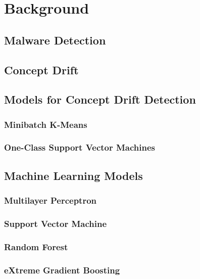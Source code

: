 \chapter{Background\label{chap:background}}

\section{Malware Detection}
\section{Concept Drift}
\section{Models for Concept Drift Detection}
\subsection{Minibatch K-Means}
\subsection{One-Class Support Vector Machines}
\section{Machine Learning Models}
\subsection{Multilayer Perceptron}
\subsection{Support Vector Machine}
\subsection{Random Forest}
\subsection{eXtreme Gradient Boosting}